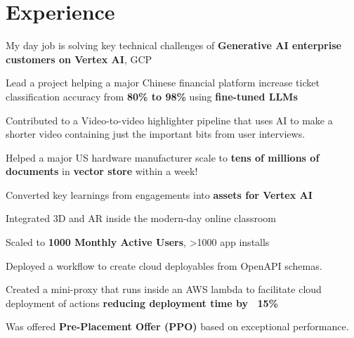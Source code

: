 \documentclass[]{deedy-resume-openfont}
\begin{document}
\begin{minipage}[t]{0.66\textwidth} 




\section{Experience}
\vspace{\topsep} %
\begin{tightemize}
\item My day job is solving key technical challenges of \textbf{Generative AI enterprise customers on Vertex AI}, GCP\\
\item Lead a project helping a major Chinese financial platform increase ticket classification accuracy from \textbf{80\% to 98\%} using \textbf{fine-tuned LLMs} 
\item Contributed to a Video-to-video highlighter pipeline that uses AI to make a shorter video containing just the important bits from user interviews.
\item Helped a major US hardware manufacturer scale to \textbf{tens of millions of documents} in \textbf{vector store} within a week!
\item Converted key learnings from engagements into \textbf{assets for Vertex AI}
\end{tightemize}

\begin{tightemize}
\item Integrated 3D and AR inside the modern-day online classroom   
\item Scaled to \textbf{1000 Monthly Active Users}, >1000 app installs
\end{tightemize}

\begin{tightemize}
\item Deployed a workflow to create cloud deployables from OpenAPI schemas.
\item Created a mini-proxy that runs inside an AWS lambda to facilitate cloud deployment of actions \textbf{reducing deployment time by ~15\%}
\item Was offered \textbf{Pre-Placement Offer (PPO)} based on exceptional performance.
\end{tightemize}


\end{minipage}
\end{document}
